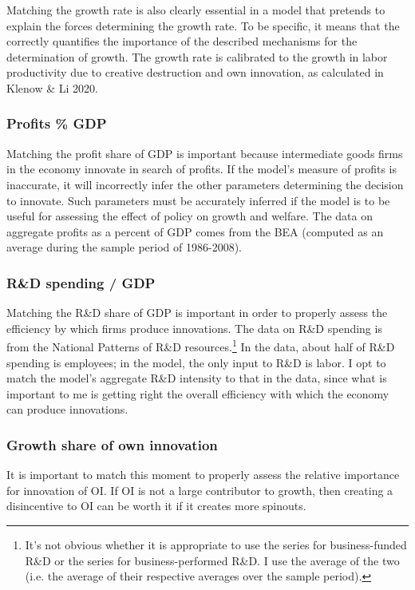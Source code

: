 \documentclass[11pt,english]{article}
\theoremstyle{remark}
\begin{document}
Matching the growth rate is also clearly essential in a model that pretends to explain the forces determining the growth rate. To be specific, it means that the correctly quantifies the importance of the described mechanisms for the determination of growth. The growth rate is calibrated to the growth in labor productivity due to creative destruction and own innovation, as calculated in Klenow \& Li 2020. 

\subsubsection{Profits \% GDP} 

Matching the profit share of GDP is important because intermediate goods firms in the economy innovate in search of profits. If the model's measure of profits is inaccurate, it will incorrectly infer the other parameters determining the decision to innovate. Such parameters must be accurately inferred if the model is to be useful for assessing the effect of policy on growth and welfare. The data on aggregate profits as a percent of GDP comes from the BEA (computed as an average during the sample period of 1986-2008). 

\subsubsection{R\&D spending / GDP}

Matching the R\&D share of GDP is important in order to properly assess the efficiency by which firms produce innovations. The data on R\&D spending is from the National Patterns of R\&D resources.\footnote{It's not obvious whether it is appropriate to use the series for business-funded R\&D or the series for business-performed R\&D. I use the average of the two (i.e. the average of their respective averages over the sample period).} In the data, about half of R\&D spending is employees; in the model, the only input to R\&D is labor. I opt to match the model's aggregate R\&D intensity to that in the data, since what is important to me is getting right the overall efficiency with which the economy can produce innovations. 

\subsubsection{Growth share of own innovation}

It is important to match this moment to properly assess the relative importance for innovation of OI. If OI is not a large contributor to growth, then creating a disincentive to OI can be worth it if it creates more spinouts. 
\end{document}
